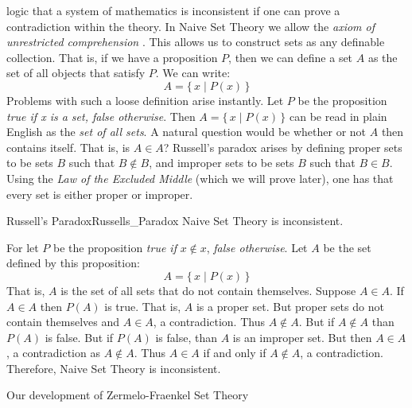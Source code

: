     logic that a system of mathematics is inconsistent if one can prove a
    contradiction within the theory. In Naive Set Theory
    we allow the \textit{axiom of unrestricted comprehension}%
    . This allows us to construct
    sets as any definable collection. That is, if we have a
    proposition $P$, then we can define a set $A$ as the set
    of all objects that satisfy $P$. We can write:
    \begin{equation}
        A=\big\{\,x\;|\;P(x)\,\big\}
    \end{equation}
    Problems with such a loose definition arise instantly. Let $P$ be the
    proposition \textit{true if x is a set, false otherwise}. Then
    $A=\{\,x\;|\;P(x)\,\}$ can be read in plain English as the
    \textit{set of all sets}. A natural question would be
    whether or not $A$ then contains itself. That is, is $A\in{A}$? Russell's
    paradox arises by defining proper sets to be sets $B$ such that
    $B\notin{B}$, and improper sets to be sets $B$ such that $B\in{B}$. Using
    the \textit{Law of the Excluded Middle}
    (which we will prove later), one has that every set is either proper or
    improper.
    \begin{ftheorem}{Russell's Paradox}{Russells_Paradox}
        Naive Set Theory is inconsistent.
    \end{ftheorem}
    \begin{bproof}
        For let $P$ be the proposition \textit{true if} $x\notin{x}$,
        \textit{false otherwise}. Let $A$ be the set defined by this
        proposition:
        \begin{equation}
            A=\big\{\,x\;|\;P(x)\,\big\}
        \end{equation}
        That is, $A$ is the set of all sets that do not contain themselves.
        Suppose $A\in{A}$. If $A\in{A}$ then $P(A)$ is true. That is, $A$ is a
        proper set. But proper sets do not contain themselves and $A\in{A}$, a
        contradiction. Thus $A\notin{A}$. But if $A\notin{A}$ than $P(A)$ is
        false. But if $P(A)$ is false, than $A$ is an improper set. But then
        $A\in{A}$, a contradiction as $A\notin{A}$. Thus $A\in{A}$ if and only
        if $A\notin{A}$, a contradiction. Therefore, Naive Set Theory is
        inconsistent.
    \end{bproof}
    Our development of Zermelo-Fraenkel Set Theory%
